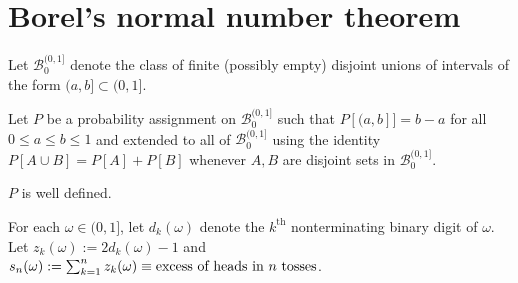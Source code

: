 



%
%
\section{Borel's normal number theorem}
\label{Bsec}




\begin{definition}
\label{fb}
Let $\mathcal B_0^{(0,1]}$ denote the class of finite (possibly empty) disjoint unions of intervals of the form  $(a,b]\subset (0,1]$.
\end{definition}

\begin{definition}
\label{l1defP}
Let $P$  be a probability assignment on $\mathcal B_0^{(0,1]}$ such that $P[(a,b]]=b-a$ for all $0\leq a\leq b\leq 1$ and extended to all of $\mathcal B_0^{(0,1]}$ using the identity $P[A\cup B]=P[A]+P[B]$ whenever $A,B$ are disjoint sets in $ \mathcal B_0^{(0,1]}$.
\end{definition}

\begin{theorem}
$P$ is well defined.
\end{theorem}


\begin{definition}
For each $\omega\in(0,1]$, let $d_k(\omega)$ denote the $k^\text{th}$ nonterminating binary digit of $\omega$. Let $z_k(\omega):=2d_k(\omega)-1$ and $s_n(\omega):=\sum_{k=1}^nz_k(\omega)\equiv\text{\rm excess of heads in $n$ tosses}$.
\end{definition}

